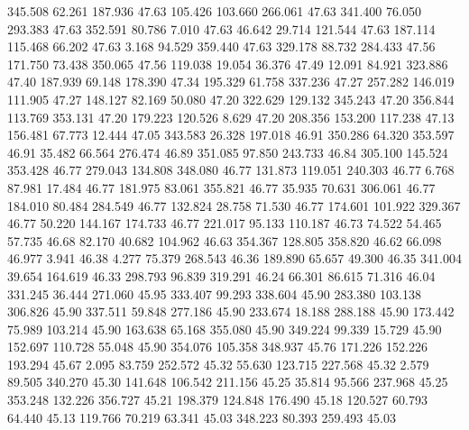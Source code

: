 345.508   62.261  187.936        47.63
 105.426  103.660  266.061        47.63
 341.400   76.050  293.383        47.63
 352.591   80.786    7.010        47.63
  46.642   29.714  121.544        47.63
 187.114  115.468   66.202        47.63
   3.168   94.529  359.440        47.63
 329.178   88.732  284.433        47.56
 171.750   73.438  350.065        47.56
 119.038   19.054   36.376        47.49
  12.091   84.921  323.886        47.40
 187.939   69.148  178.390        47.34
 195.329   61.758  337.236        47.27
 257.282  146.019  111.905        47.27
 148.127   82.169   50.080        47.20
 322.629  129.132  345.243        47.20
 356.844  113.769  353.131        47.20
 179.223  120.526    8.629        47.20
 208.356  153.200  117.238        47.13
 156.481   67.773   12.444        47.05
 343.583   26.328  197.018        46.91
 350.286   64.320  353.597        46.91
  35.482   66.564  276.474        46.89
 351.085   97.850  243.733        46.84
 305.100  145.524  353.428        46.77
 279.043  134.808  348.080        46.77
 131.873  119.051  240.303        46.77
   6.768   87.981   17.484        46.77
 181.975   83.061  355.821        46.77
  35.935   70.631  306.061        46.77
 184.010   80.484  284.549        46.77
 132.824   28.758   71.530        46.77
 174.601  101.922  329.367        46.77
  50.220  144.167  174.733        46.77
 221.017   95.133  110.187        46.73
  74.522   54.465   57.735        46.68
  82.170   40.682  104.962        46.63
 354.367  128.805  358.820        46.62
  66.098   46.977    3.941        46.38
   4.277   75.379  268.543        46.36
 189.890   65.657   49.300        46.35
 341.004   39.654  164.619        46.33
 298.793   96.839  319.291        46.24
  66.301   86.615   71.316        46.04
 331.245   36.444  271.060        45.95
 333.407   99.293  338.604        45.90
 283.380  103.138  306.826        45.90
 337.511   59.848  277.186        45.90
 233.674   18.188  288.188        45.90
 173.442   75.989  103.214        45.90
 163.638   65.168  355.080        45.90
 349.224   99.339   15.729        45.90
 152.697  110.728   55.048        45.90
 354.076  105.358  348.937        45.76
 171.226  152.226  193.294        45.67
   2.095   83.759  252.572        45.32
  55.630  123.715  227.568        45.32
   2.579   89.505  340.270        45.30
 141.648  106.542  211.156        45.25
  35.814   95.566  237.968        45.25
 353.248  132.226  356.727        45.21
 198.379  124.848  176.490        45.18
 120.527   60.793   64.440        45.13
 119.766   70.219   63.341        45.03
 348.223   80.393  259.493        45.03

